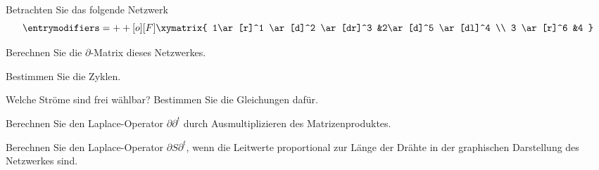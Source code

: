 Betrachten Sie das folgende Netzwerk
\[
\entrymodifiers={++[o][F]}
\xymatrix{
1\ar[r]^1 \ar[d]^2 \ar[dr]^3
	&2\ar[d]^5 \ar[dl]^4
\\
3 \ar[r]^6
	&4
}
\]
\begin{teilaufgaben}
\item Berechnen Sie die $\partial$-Matrix dieses Netzwerkes.
\item Bestimmen Sie die Zyklen.
\item Welche Ströme sind frei wählbar? Bestimmen Sie die Gleichungen dafür.
\item Berechnen Sie den Laplace-Operator $\partial\partial^t$ 
durch Ausmultiplizieren des Matrizenproduktes.
\item Berechnen Sie den Laplace-Operator $\partial S\partial^t$, wenn
die Leitwerte proportional zur Länge der Drähte in der graphischen
Darstellung des Netzwerkes sind.
\end{teilaufgaben}


